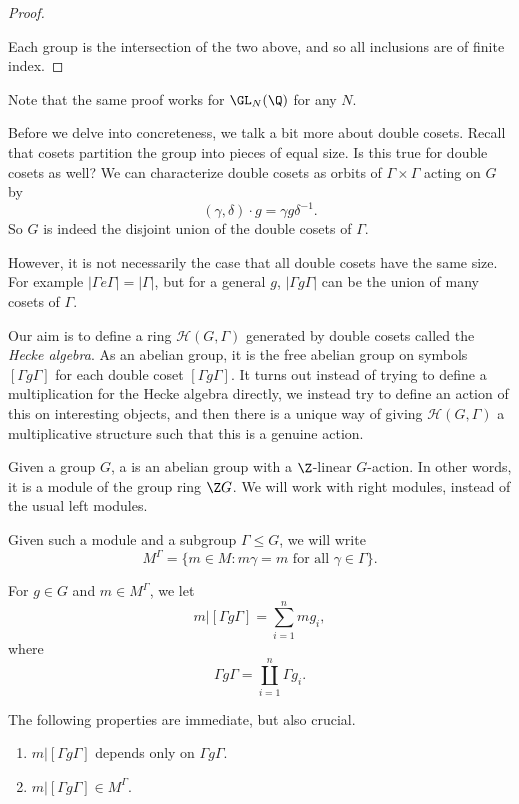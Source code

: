 \documentclass[a4paper]{article}
\begin{document}
\begin{proof}
\begin{center}
  \end{center}
  Each group is the intersection of the two above, and so all inclusions are of finite index.
\end{proof}
Note that the same proof works for $\GL_N(\Q)$ for any $N$.

Before we delve into concreteness, we talk a bit more about double cosets. Recall that cosets partition the group into pieces of equal size. Is this true for double cosets as well? We can characterize double cosets as orbits of $\Gamma \times \Gamma$ acting on $G$ by
\[
  (\gamma, \delta) \cdot g = \gamma g \delta^{-1}.
\]
So $G$ is indeed the disjoint union of the double cosets of $\Gamma$.

However, it is not necessarily the case that all double cosets have the same size. For example $|\Gamma e \Gamma| = |\Gamma|$, but for a general $g$, $|\Gamma g \Gamma|$ can be the union of many cosets of $\Gamma$.

Our aim is to define a ring $\mathcal{H}(G, \Gamma)$ generated by double cosets called the \emph{Hecke algebra}. As an abelian group, it is the free abelian group on symbols $[\Gamma g\Gamma]$ for each double coset $[\Gamma g \Gamma]$. It turns out instead of trying to define a multiplication for the Hecke algebra directly, we instead try to define an action of this on interesting objects, and then there is a unique way of giving $\mathcal{H}(G, \Gamma)$ a multiplicative structure such that this is a genuine action.

Given a group $G$, a  is an abelian group with a $\Z$-linear $G$-action. In other words, it is a module of the group ring $\Z G$. We will work with right modules, instead of the usual left modules.

Given such a module and a subgroup $\Gamma \leq G$, we will write
\[
  M^\Gamma = \{m \in M : m \gamma = m \text{ for all } \gamma \in \Gamma\}.
\]
\begin{notation}
  For $g \in G$ and $m \in M^\Gamma$, we let
  \[
    m|[\Gamma g \Gamma] = \sum_{i = 1}^n m g_i,\tag{$*$}
  \]
  where
  \[
    \Gamma g \Gamma = \coprod_{i = 1}^n \Gamma g_i.
  \]
\end{notation}
The following properties are immediate, but also crucial.
\begin{prop}\leavevmode
  \begin{enumerate}
    \item $m | [\Gamma g \Gamma]$ depends only on $\Gamma g \Gamma$.
    \item $m|[\Gamma g \Gamma] \in M^\Gamma$.
  \end{enumerate}
\end{prop}
\end{document}
